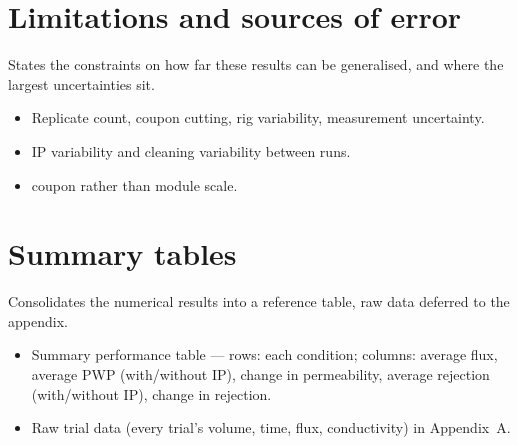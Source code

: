 \section{Limitations and sources of error}
\label{sec:res-limitations}
States the constraints on how far these results can be generalised, and where the largest uncertainties sit.

\begin{itemize}
  \item Replicate count, coupon cutting, rig variability, measurement uncertainty.
  \item IP variability and cleaning variability between runs.
  \item coupon rather than module scale.
\end{itemize}


\section{Summary tables}
\label{sec:res-tables}
Consolidates the numerical results into a  reference table, raw data deferred to the appendix.

\begin{itemize}
  \item Summary performance table --- rows: each condition; columns: average flux, average PWP (with/without IP), change in permeability, average rejection (with/without IP), change in rejection.
  \item Raw trial data (every trial's volume, time, flux, conductivity) in Appendix~A.
\end{itemize}